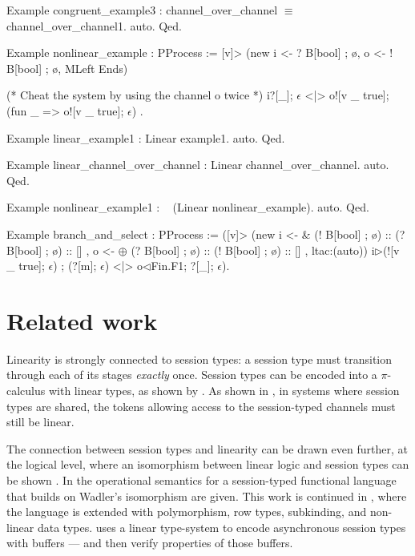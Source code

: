 \documentclass{mproj}
\newcommand{\picalc}{$\pi$-calculus}
\begin{document}
\begin{coq}
Example congruent_example3 : channel_over_channel $\equiv$ channel_over_channel1. auto. Qed.

Example nonlinear_example : PProcess :=
  [v]> (new i <- ? B[bool] ; ø, o <- ! B[bool] ; ø, MLeft Ends)

    (* Cheat the system by using the channel o twice *)
    i?[_]; $\epsilon$ <|> o![v _ true]; (fun _ => o![v _ true]; $\epsilon$)
    .

Example linear_example1 : Linear example1. auto. Qed.

Example linear_channel_over_channel : Linear channel_over_channel. auto. Qed.

Example nonlinear_example1 : ~ (Linear nonlinear_example). auto. Qed.

Example branch_and_select : PProcess :=
  ([v]> (new
           i <- &{ (! B[bool] ; ø) :: (? B[bool] ; ø) :: [] },
           o <- $\oplus${ (? B[bool] ; ø) :: (! B[bool] ; ø) :: [] },
           ltac:(auto))
          i$\triangleright${(![v _ true]; $\epsilon$) ; (?[m]; $\epsilon$)} <|> o$\triangleleft$Fin.F1; ?[_]; $\epsilon$).
\end{coq}

\chapter{Related work}\label{related-work}

Linearity is strongly connected to session types: a session type must transition through each of its stages \emph{exactly} once. Session types can be encoded into a \picalc{} with linear types, as shown by \cite{Kobayashi1996,Dardha2012,Dardha2016}. As shown in \cite{Voinea}, in systems where session types are shared, the tokens allowing access to the session-typed channels must still be linear.

The connection between session types and linearity can be drawn even further, at the logical level, where an isomorphism between linear logic and session types can be shown \cite{Caires2010} \cite{Wadler2014}. In \cite{Lindley2015} the operational semantics for a session-typed functional language that builds on Wadler's isomorphism are given. This work is continued in \cite{Lindley}, where the language is extended with polymorphism, row types, subkinding, and non-linear data types. \cite{Gay2010} uses a linear type-system to encode asynchronous session types with buffers --- and then verify properties of those buffers.
\end{document}
